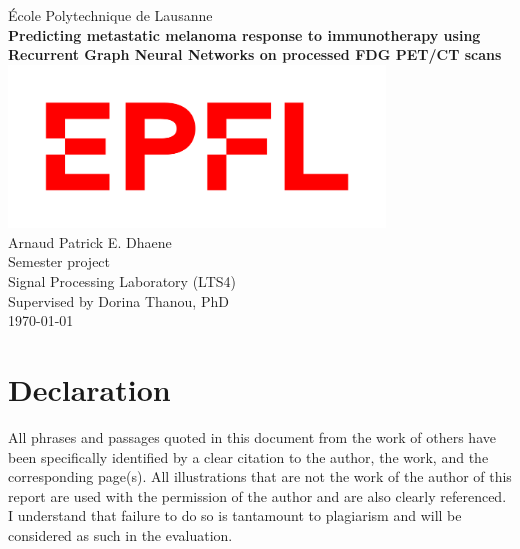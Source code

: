 \documentclass[11pt,oneside,english]{book}
\begin{document}

\frontmatter

\begin{titlepage}



\begin{center}
{\LARGE École Polytechnique de Lausanne}\\[1.5cm]
\linespread{1.2}\huge {\bfseries Predicting metastatic melanoma response to immunotherapy using Recurrent Graph Neural Networks on processed FDG PET/CT scans}\\[1.5cm]
\linespread{1}
\includegraphics[width=10cm]{images/EPFL_logo.png}\\[1cm]
{\Large Arnaud Patrick E. Dhaene}\\[1cm]
\large Semester project\\[0.3cm] 
Signal Processing Laboratory (LTS4)\\[0.3cm]
Supervised by Dorina Thanou, PhD\\[2cm]
\today
\end{center}

\end{titlepage}



\newpage
\section*{\Large Declaration}

All phrases and passages quoted in this document from the work of others have been specifically identified by a clear citation to the author, the work, and the corresponding page(s). All illustrations that are not the work of the author of this report are used with the permission of the author and are also clearly referenced. I understand that failure to do so is tantamount to plagiarism and will be considered as such in the evaluation.\\[1cm]
\end{document}
